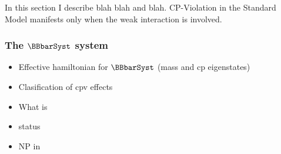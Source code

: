 
In this section I describe blah blah and blah.
CP-Violation in the Standard Model manifests only when the weak interaction is involved.

\subsubsection{The $\BBbarSyst$ system}


\begin{itemize}
  \item Effective hamiltonian for $\BBbarSyst$ (mass and cp eigenstates)
  \item Clasification of cpv effects
  \item What is \phis
  \item \phis status
  \item NP in \phis
\end{itemize}
